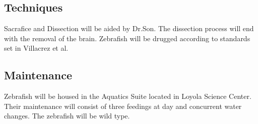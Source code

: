 \documentclass{article}\usepackage[]{graphicx}\usepackage[]{color}
\begin{document}
\subsection{Techniques}
Sacrafice and Dissection will be aided by Dr.Son. The dissection process will end with the removal of the brain.
Zebrafish will be drugged according to standards set in Villacrez et al.
\subsection{Maintenance}
Zebrafish will be housed in the Aquatics Suite located in Loyola Science Center. Their maintenance will consist of three feedings at day and concurrent water changes. The zebrafish will be wild type.



\end{document}
